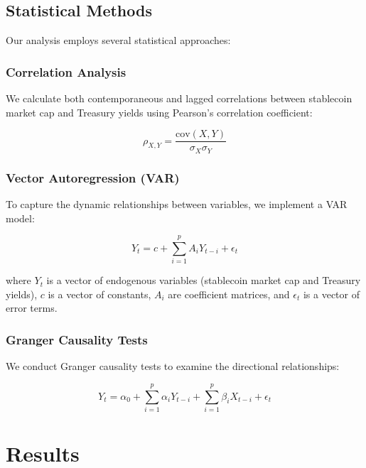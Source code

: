 \documentclass[12pt,a4paper]{article}
\begin{document}
\subsection{Statistical Methods}
Our analysis employs several statistical approaches:

\subsubsection{Correlation Analysis}
We calculate both contemporaneous and lagged correlations between stablecoin market cap and Treasury yields using Pearson's correlation coefficient:

\begin{equation}
    \rho_{X,Y} = \frac{\text{cov}(X,Y)}{\sigma_X \sigma_Y}
\end{equation}

\subsubsection{Vector Autoregression (VAR)}
To capture the dynamic relationships between variables, we implement a VAR model:

\begin{equation}
    Y_t = c + \sum_{i=1}^{p} A_i Y_{t-i} + \epsilon_t
\end{equation}

where $Y_t$ is a vector of endogenous variables (stablecoin market cap and Treasury yields), $c$ is a vector of constants, $A_i$ are coefficient matrices, and $\epsilon_t$ is a vector of error terms.

\subsubsection{Granger Causality Tests}
We conduct Granger causality tests to examine the directional relationships:

\begin{equation}
    Y_t = \alpha_0 + \sum_{i=1}^{p} \alpha_i Y_{t-i} + \sum_{i=1}^{p} \beta_i X_{t-i} + \epsilon_t
\end{equation}

\section{Results}
\end{document}
